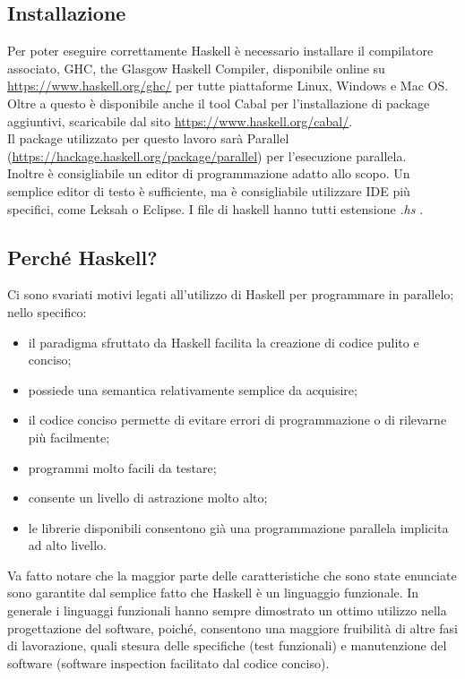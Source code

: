 \subsection{Installazione}
Per poter eseguire correttamente Haskell è necessario installare il compilatore associato, GHC, the Glasgow Haskell Compiler, disponibile online su \url{https://www.haskell.org/ghc/} per tutte piattaforme Linux, Windows e Mac OS.\\
Oltre a questo è disponibile anche il tool Cabal per l'installazione di package aggiuntivi, scaricabile dal sito \url{https://www.haskell.org/cabal/}.\\
Il package utilizzato per questo lavoro sarà Parallel (\url{https://hackage.haskell.org/package/parallel}) per l'esecuzione parallela.\\
Inoltre è consigliabile un editor di programmazione adatto allo scopo. Un semplice editor di testo è sufficiente, ma è consigliabile utilizzare IDE più specifici, come Leksah o Eclipse. I file di haskell hanno tutti estensione \textit{.hs} .
\subsection{Perché Haskell?}
Ci sono svariati motivi legati all'utilizzo di Haskell per programmare in parallelo; nello specifico:
\begin{itemize}
\item{il paradigma sfruttato da Haskell facilita la creazione di codice pulito e conciso;}
\item{possiede una semantica relativamente semplice da acquisire;}
\item{il codice conciso permette di evitare errori di programmazione o di rilevarne più facilmente;}
\item{programmi molto facili da testare;}
\item{consente un livello di astrazione molto alto;}
\item{le librerie disponibili consentono già una programmazione parallela implicita ad alto livello.}
\end{itemize}
Va fatto notare che la maggior parte delle caratteristiche che sono state enunciate sono garantite dal semplice fatto che Haskell è un linguaggio funzionale. In generale i linguaggi funzionali hanno sempre dimostrato un ottimo utilizzo nella progettazione del software, poiché, consentono una maggiore fruibilità di altre fasi di lavorazione, quali stesura delle specifiche (test funzionali) e manutenzione del software (software inspection facilitato dal codice conciso).\\
